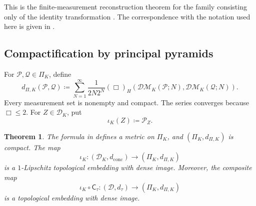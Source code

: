 \documentclass[11pt]{amsart}
\theoremstyle{plain}
\newtheorem{theorem}{Theorem}[section]
\theoremstyle{definition}
\theoremstyle{remark}
\newcommand{\D}{\mathcal D}
\newcommand{\DK}{\mathcal D_K}
\newcommand{\DM}{\mathcal{DM}}
\newcommand{\dconc}{d_{\mathrm{conc}}}
\newcommand{\dtau}{d_{\tau}}
\begin{document}
This is the finite-measurement reconstruction theorem for the family consisting only of the identity transformation \cite[Proposition~6.24]{gds2}. The correspondence with the notation used here is given in .

\subsection{Compactification by principal pyramids}
\label{subsec:pyramid-main-compactification}

For $\mathcal P,\mathcal Q\in\Pi_K$, define
\begin{equation}
\label{eq:pyramid-metric}
d_{\Pi,K}(\mathcal P,\mathcal Q)\coloneqq\sum_{N=1}^\infty\frac{1}{2N2^N}(\Box)_H(\DM_K(\mathcal P;N),\DM_K(\mathcal Q;N)).
\end{equation}
Every measurement set is nonempty and compact. The series converges because $\Box\leq2$. For $Z\in\DK$, put
\[
\iota_K(Z)\coloneqq\mathcal P_Z.
\]

\begin{theorem}
\label{thm:K-pyramid-compactification}
The formula in  defines a metric on $\Pi_K$, and $(\Pi_K,d_{\Pi,K})$ is compact. The map
\[
\iota_K\colon(\DK,\dconc)\longrightarrow(\Pi_K,d_{\Pi,K})
\]
is a $1$-Lipschitz topological embedding with dense image. Moreover, the composite map
\[
\iota_K\circ\mathsf C_\tau\colon(\D,\dtau)\longrightarrow(\Pi_K,d_{\Pi,K})
\]
is a topological embedding with dense image.
\end{theorem}
\end{document}
